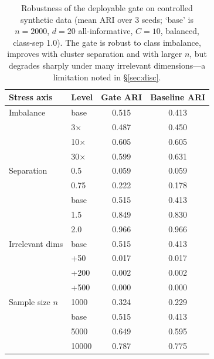 \begin{table}[htbp]
\centering
\caption{Robustness of the deployable gate on controlled synthetic data (mean ARI over 3 seeds; `base' is $n{=}2000$, $d{=}20$ all-informative, $C{=}10$, balanced, class-sep 1.0). The gate is robust to class imbalance, improves with cluster separation and with larger $n$, but degrades sharply under many irrelevant dimensions---a limitation noted in \S\ref{sec:disc}.}
\label{tab:robustness}
\footnotesize
\begin{tabular}{llcc}
\toprule
Stress axis & Level & Gate ARI & Baseline ARI \\
\midrule
Imbalance & base & 0.515 & 0.413 \\
 & 3$\times$ & 0.487 & 0.450 \\
 & 10$\times$ & 0.605 & 0.605 \\
 & 30$\times$ & 0.599 & 0.631 \\
\midrule
Separation & 0.5 & 0.059 & 0.059 \\
 & 0.75 & 0.222 & 0.178 \\
 & base & 0.515 & 0.413 \\
 & 1.5 & 0.849 & 0.830 \\
 & 2.0 & 0.966 & 0.966 \\
\midrule
Irrelevant dims & base & 0.515 & 0.413 \\
 & +50 & 0.017 & 0.017 \\
 & +200 & 0.002 & 0.002 \\
 & +500 & 0.000 & 0.000 \\
\midrule
Sample size $n$ & 1000 & 0.324 & 0.229 \\
 & base & 0.515 & 0.413 \\
 & 5000 & 0.649 & 0.595 \\
 & 10000 & 0.787 & 0.775 \\
\bottomrule
\end{tabular}
\end{table}

